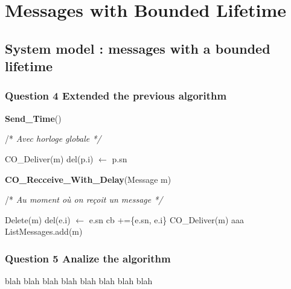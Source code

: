 \chapter{Messages with Bounded Lifetime}

\section{System model : messages with a bounded lifetime}

\subsection{Question 4 Extended the previous algorithm}
\begin{algorithm}
\caption{\textbf{Send\_Time}()}
/* \textit{ Avec horloge globale */}
\label{algo:Q4a}
\begin{algorithmic}[1]
      \STATE  CO\_Deliver(m)
   \STATE  del(p.i) $\leftarrow$ p.sn
   \ENDIF
   \ENDFOR
  \ENDIF
\end{algorithmic}
\end{algorithm}


\begin{algorithm}
\caption{\textbf{CO\_Recceive\_With\_Delay}(Message m)}
/* \textit{ Au moment où on reçoit un message */}
\label{algo:Q4b}
\begin{algorithmic}[1]
  \STATE Delete(m)
   \STATE  del(e.i) $\leftarrow$ e.sn
     \STATE  cb +=\{e.sn, e.i\}
     \STATE  CO\_Deliver(m)
     \STATE aaa %
       \ENDFOR
       \ELSE
       \STATE ListMessages.add(m)
       \ENDIF
\end{algorithmic}
\end{algorithm}


\subsection{Question 5 Analize the algorithm}
 blah  blah  blah  blah  blah  blah  blah  blah 



